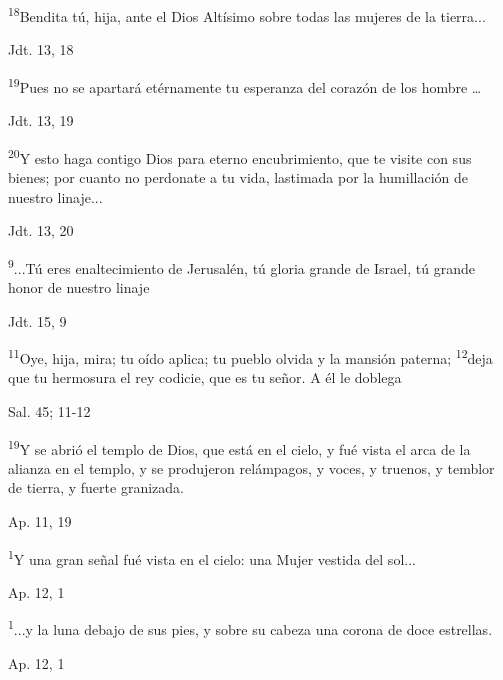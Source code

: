 \documentclass[a4paper,11pt]{article}
\begin{document}
      \textsuperscript{18}Bendita tú, hija, ante el Dios Altísimo sobre todas las mujeres de la tierra...
      \begin{flushright}
        Jdt. 13, 18
      \end{flushright}

      \textsuperscript{19}Pues no se apartará etérnamente tu esperanza del corazón de los hombre \ldots
      \begin{flushright}
        Jdt. 13, 19
      \end{flushright}

      \textsuperscript{20}Y esto haga contigo Dios para eterno encubrimiento, que te visite con sus bienes; por cuanto no perdonate
      a tu vida, lastimada por la humillación de nuestro linaje...
      \begin{flushright}
        Jdt. 13, 20
      \end{flushright}

      \textsuperscript{9}...Tú eres enaltecimiento de Jerusalén, tú gloria grande de Israel, tú grande honor de nuestro linaje
      \begin{flushright}
        Jdt. 15, 9
      \end{flushright}

      \textsuperscript{11}Oye, hija, mira; tu oído aplica; tu pueblo olvida y la mansión paterna; \textsuperscript{12}deja que tu hermosura
      el rey codicie, que es tu señor. A él le doblega
      \begin{flushright}
        Sal. 45; 11-12
      \end{flushright}

      \textsuperscript{19}Y se abrió el templo de Dios, que está en el cielo, y fué vista el arca de la alianza en el templo,
      y se produjeron relámpagos, y voces, y truenos, y temblor de tierra, y fuerte granizada.
      \begin{flushright}
        Ap. 11, 19
      \end{flushright}

      \textsuperscript{1}Y una gran señal fué vista en el cielo: una Mujer vestida del sol...
      \begin{flushright}
        Ap. 12, 1
      \end{flushright}

      \textsuperscript{1}...y la luna debajo de sus pies, y sobre su cabeza una corona de doce estrellas.
      \begin{flushright}
        Ap. 12, 1
      \end{flushright}
\end{document}

